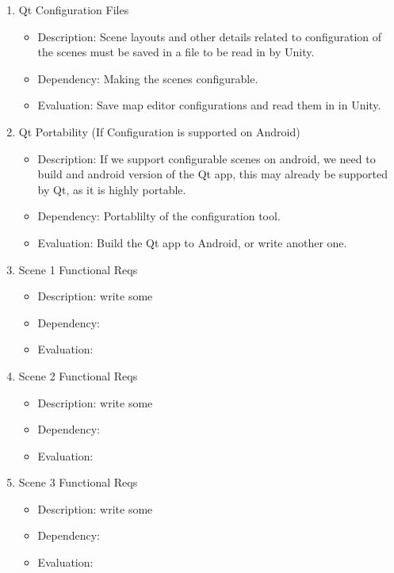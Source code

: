 \documentclass[a4paper,10pt]{article}
\begin{document}
\begin{enumerate}
		\item Qt Configuration Files
		\begin{itemize}
		 \item Description: Scene layouts and other details related to configuration of the scenes must be saved in a file to be read in by Unity.
		 \item Dependency:  Making the scenes configurable.
		 \item Evaluation:  Save map editor configurations and read them in in Unity.
		\end{itemize}
		\item Qt Portability (If Configuration is supported on Android)
		\begin{itemize}
		 \item Description: If we support configurable scenes on android, we need to build and android version of the Qt app, this may already be supported by Qt, as it is highly portable.
		 \item Dependency:  Portablilty of the configuration tool.
		 \item Evaluation:  Build the Qt app to Android, or write another one. 
		\end{itemize}
		\item Scene 1 Functional Reqs
		\begin{itemize}
		 \item Description: write some
		 \item Dependency:  
		 \item Evaluation:
		\end{itemize}
		
		\item Scene 2 Functional Reqs
		\begin{itemize}
		 \item Description: write some
		 \item Dependency:  
		 \item Evaluation:
		\end{itemize}
		\item Scene 3 Functional Reqs
		\begin{itemize}
		 \item Description: write some
		 \item Dependency:  
		 \item Evaluation:
		\end{itemize}
	\end{enumerate}
\end{document}
